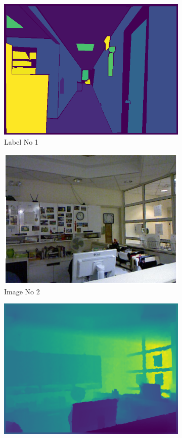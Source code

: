 \documentclass[a4paper, openany]{book}
\begin{document}
\begin{figure}[ht]
\begin{subfigure}[b]{0.3\linewidth}
    \includegraphics[width=\linewidth]{images/labelNo14.png}
    \caption{Label No 1}
  \end{subfigure}
  \begin{subfigure}[b]{0.3\linewidth}
    \includegraphics[width=\linewidth]{images/imgNo12.png}
    \caption{Image No 2}
  \end{subfigure}
  \begin{subfigure}[b]{0.3\linewidth}
    \includegraphics[width=\linewidth]{images/depthNo12.png}

\end{subfigure}
\end{figure}
\end{document}
